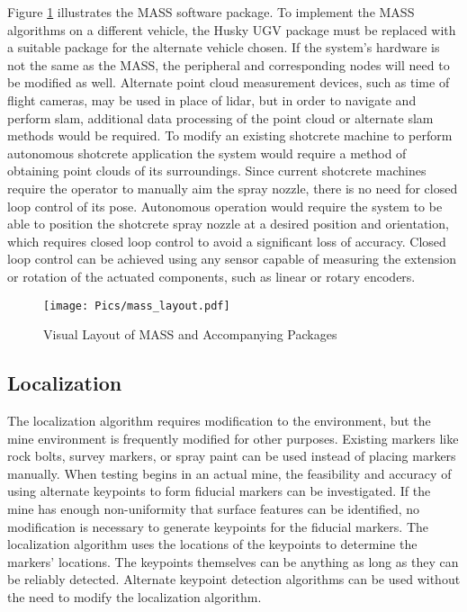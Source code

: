 Figure \ref{fig:masslay} illustrates the MASS software package. To implement the MASS algorithms on a different vehicle, the Husky UGV package must be replaced with a suitable package for the alternate vehicle chosen. If the system's hardware is not the same as the MASS, the peripheral and corresponding nodes will need to be modified as well. Alternate point cloud measurement devices, such as time of flight cameras, may be used in place of \acrshort{lidar}, but in order to navigate and perform \acrshort{slam}, additional data processing of the point cloud or alternate \acrshort{slam} methods would be required. To modify an existing shotcrete machine to perform autonomous shotcrete application the system would require a method of obtaining point clouds of its surroundings. Since current shotcrete machines require the operator to manually aim the spray nozzle, there is no need for closed loop control of its pose. Autonomous operation would require the system to be able to position the shotcrete spray nozzle at a desired position and orientation, which requires closed loop control to avoid a significant loss of accuracy. Closed loop control can be achieved using any sensor capable of measuring the extension or rotation of the actuated components, such as linear or rotary encoders.\\

\begin{figure}[h]
    \centering
\texttt{[image: Pics/mass\_layout.pdf]} 
    \caption{Visual Layout of MASS and Accompanying Packages}
    \label{fig:masslay}
\end{figure}

\subsection{Localization}

The localization algorithm requires modification to the environment, but the mine environment is frequently modified for other purposes. Existing markers like rock bolts, survey markers, or spray paint can be used instead of placing markers manually. When testing begins in an actual mine, the feasibility and accuracy of using alternate keypoints to form fiducial markers can be investigated. If the mine has enough non-uniformity that surface features can be identified, no modification is necessary to generate keypoints for the fiducial markers. The localization algorithm uses the locations of the keypoints to determine the markers' locations. The keypoints themselves can be anything as long as they can be reliably detected. Alternate keypoint detection algorithms can be used without the need to modify the localization algorithm.\\

